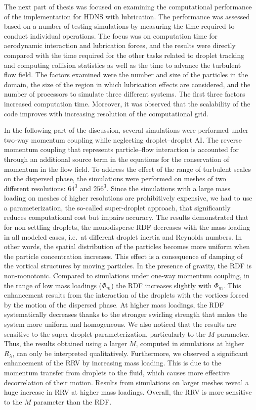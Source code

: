 \documentclass[../thesis.tex]{subfiles}
\begin{document}
The next part of thesis was focused on examining the computational performance of the implementation for HDNS with lubrication. The performance was assessed based on a number of testing simulations by measuring the time required to conduct individual operations. The focus was on computation time for aerodynamic interaction and lubrication forces, and the results were directly compared with the time required for the other tasks related to droplet tracking and computing collision statistics as well as the time to advance the turbulent flow field. The factors examined were the number and size of the particles in the domain, the size of the region in which lubrication effects are considered, and the number of processors to simulate three different systems. The first three factors increased computation time. Moreover, it was observed that the scalability of the code improves with increasing resolution of the computational grid. 

In the following part of the discussion, several simulations were performed under two-way momentum coupling while neglecting droplet--droplet AI. The reverse momentum coupling that represents particle--flow interaction is accounted for through an additional source term in the equations for the conservation of momentum in the flow field. To address the effect of the range of turbulent scales on the dispersed phase, the simulations were performed on meshes of two different resolutions: $64^3$ and $256^3$. Since the simulations with a large mass loading on meshes of higher resolutions are prohibitively expensive, we had to use a parameterization, the so-called super-droplet approach, that significantly reduces computational cost but impairs accuracy. The results demonstrated that for non-settling droplets, the monodisperse RDF decreases with the mass loading in all modeled cases, i.e.\ at different droplet inertia and Reynolds numbers. In other words, the spatial distribution of the particles becomes more uniform when the particle concentration increases. This effect is a consequence of damping of the vortical structures by moving particles. In the presence of gravity, the RDF is non-monotonic. Compared to simulations under one-way momentum coupling, in the range of low mass loadings ($\Phi_m$) the RDF increases slightly with $\Phi_m$. This enhancement results from the interaction of the droplets with the vortices forced by the motion of the dispersed phase. At higher mass loadings, the RDF systematically decreases thanks to the stronger swirling strength that makes the system more uniform and homogeneous. We also noticed that the results are sensitive to the super-droplet parameterization, particularly to the $M$ parameter. Thus, the results obtained using a larger $M$, computed in simulations at higher $R_{\lambda}$, can only be interpreted qualitatively. Furthermore, we observed a significant enhancement of the RRV by increasing mass loading. This is due to the momentum transfer from droplets to the fluid, which causes more effective decorrelation of their motion. Results from simulations on larger meshes reveal a huge increase in RRV at higher mass loadings. Overall, the RRV is more sensitive to the $M$ parameter than the RDF. 
\end{document}
